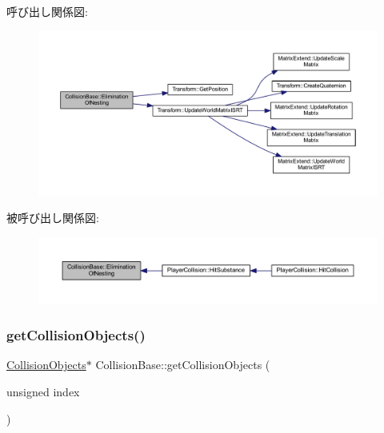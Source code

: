 呼び出し関係図\+:\nopagebreak
\begin{figure}[H]
\begin{center}
\leavevmode
\includegraphics[width=350pt]{class_collision_base_a257660ba9ad63f8c92137fdd24ad46cb_cgraph}
\end{center}
\end{figure}
被呼び出し関係図\+:\nopagebreak
\begin{figure}[H]
\begin{center}
\leavevmode
\includegraphics[width=350pt]{class_collision_base_a257660ba9ad63f8c92137fdd24ad46cb_icgraph}
\end{center}
\end{figure}
\mbox{\label{class_collision_base_a2e54e04c6ebd809ac2bc955083fec61c}} 
\subsubsection{\texorpdfstring{get\+Collision\+Objects()}{getCollisionObjects()}}
{\footnotesize\ttfamily \mbox{\hyperlink{class_collision_objects}{Collision\+Objects}}$\ast$ Collision\+Base\+::get\+Collision\+Objects (\begin{DoxyParamCaption}\item[{unsigned}]{index }\end{DoxyParamCaption})\hspace{0.3cm}{\ttfamily [inline]}}



